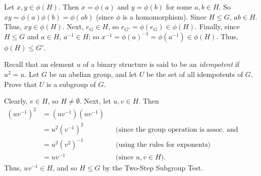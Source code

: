 \begin{solution}[print=false]
Let $x,y\in \phi(H)$.  Then $x=\phi(a)$ and $y=\phi(b)$ for some $a,b\in H$.  So $xy=\phi(a)\phi(b)=\phi(ab)$ (since $\phi$ is a homomorphism).  Since $H\leq G$, $ab\in H$.  Thus, $xy\in \phi(H)$.  Next, $e_G\in H$, so $e_{G'}=\phi(e_G)\in \phi(H)$. Finally, since $H\leq G$ and $a\in H$, $a^{-1}\in H$; so $x^{-1}=\phi(a)^{-1}=\phi(a^{-1}) \in \phi(H)$. Thus, $\phi(H)\leq G'$.

\end{solution}

\begin{exercise}[ID=4D, subtitle=(Extra Credit)]
Recall that an element $u$ of a binary structure is said to be an \textit{idempotent} if $u^2=u$.  Let $G$ be an abelian group, and let $U$ be the set of all idempotents of $G$.  Prove that $U$ is a subgroup of $G$.
\end{exercise}

\begin{solution}[print=false]
Clearly, $e\in H$, so $H\neq \emptyset$.  Next, let $u,v\in H$. Then
\begin{align*}(uv^{-1})^2&=(uv^{-1})(uv^{-1})&&\\
&=u^2(v^{-1})^2 &&\text{(since the group operation is assoc. and comm.)}\\
&=u^2(v^2)^{-1} &&\text{(using the rules for exponents)}\\
&=uv^{-1}&&\text{(since $u,v\in H$).}
\end{align*}
Thus, $uv^{-1}\in H$, and so $H \leq G$ by the Two-Step Subgroup Test. \end{solution}


